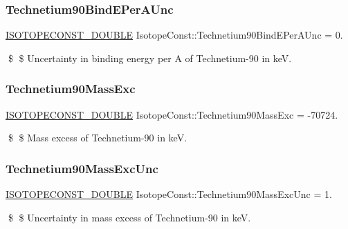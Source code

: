 \subsubsection{\texorpdfstring{Technetium90\+Bind\+E\+Per\+A\+Unc}{Technetium90BindEPerAUnc}}
{\footnotesize\ttfamily \mbox{\hyperlink{group___isotope_const-_macros_ga8f45a7272ce02c0b4c65c44636ed719a}{I\+S\+O\+T\+O\+P\+E\+C\+O\+N\+S\+T\+\_\+\+D\+O\+U\+B\+LE}} Isotope\+Const\+::\+Technetium90\+Bind\+E\+Per\+A\+Unc = 0.}

\$ \$ Uncertainty in binding energy per A of Technetium-\/90 in keV. \mbox{\label{group___isotope_const-_technetium-_tc90_ga79bf0ef889bb0beea4508871403d49ad}} 
\subsubsection{\texorpdfstring{Technetium90\+Mass\+Exc}{Technetium90MassExc}}
{\footnotesize\ttfamily \mbox{\hyperlink{group___isotope_const-_macros_ga8f45a7272ce02c0b4c65c44636ed719a}{I\+S\+O\+T\+O\+P\+E\+C\+O\+N\+S\+T\+\_\+\+D\+O\+U\+B\+LE}} Isotope\+Const\+::\+Technetium90\+Mass\+Exc = -\/70724.}

\$ \$ Mass excess of Technetium-\/90 in keV. \mbox{\label{group___isotope_const-_technetium-_tc90_ga272bb37a4660fc685567cc53f2aa1d79}} 
\subsubsection{\texorpdfstring{Technetium90\+Mass\+Exc\+Unc}{Technetium90MassExcUnc}}
{\footnotesize\ttfamily \mbox{\hyperlink{group___isotope_const-_macros_ga8f45a7272ce02c0b4c65c44636ed719a}{I\+S\+O\+T\+O\+P\+E\+C\+O\+N\+S\+T\+\_\+\+D\+O\+U\+B\+LE}} Isotope\+Const\+::\+Technetium90\+Mass\+Exc\+Unc = 1.}

\$ \$ Uncertainty in mass excess of Technetium-\/90 in keV. \mbox{\label{group___isotope_const-_technetium-_tc90_gaa1c8a8d3eb57d61208c835062fc98b45}} 
